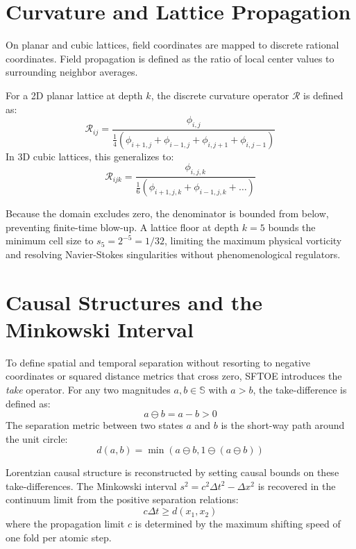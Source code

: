 \documentclass[11pt,a4paper]{article}
\begin{document}
\section{Curvature and Lattice Propagation}
On planar and cubic lattices, field coordinates are mapped to discrete rational coordinates. Field propagation is defined as the ratio of local center values to surrounding neighbor averages.

For a 2D planar lattice at depth $k$, the discrete curvature operator $\mathcal{R}$ is defined as:
\begin{equation}
\mathcal{R}_{ij} = \frac{\phi_{i,j}}{\frac{1}{4}(\phi_{i+1,j} + \phi_{i-1,j} + \phi_{i,j+1} + \phi_{i,j-1})}
\end{equation}
In 3D cubic lattices, this generalizes to:
\begin{equation}
\mathcal{R}_{ijk} = \frac{\phi_{i,j,k}}{\frac{1}{6}(\phi_{i+1,j,k} + \phi_{i-1,j,k} + \dots)}
\end{equation}

Because the domain excludes zero, the denominator is bounded from below, preventing finite-time blow-up. A lattice floor at depth $k=5$ bounds the minimum cell size to $s_5 = 2^{-5} = 1/32$, limiting the maximum physical vorticity and resolving Navier-Stokes singularities without phenomenological regulators.

\section{Causal Structures and the Minkowski Interval}
To define spatial and temporal separation without resorting to negative coordinates or squared distance metrics that cross zero, SFTOE introduces the \textit{take} operator. For any two magnitudes $a, b \in \mathbb{S}$ with $a > b$, the take-difference is defined as:
\begin{equation}
a \ominus b = a - b > 0
\end{equation}
The separation metric between two states $a$ and $b$ is the short-way path around the unit circle:
\begin{equation}
d(a, b) = \min(a \ominus b, 1 \ominus (a \ominus b))
\end{equation}

Lorentzian causal structure is reconstructed by setting causal bounds on these take-differences. The Minkowski interval $s^2 = c^2 \Delta t^2 - \Delta x^2$ is recovered in the continuum limit from the positive separation relations:
\begin{equation}
c \Delta t \ge d(x_1, x_2)
\end{equation}
where the propagation limit $c$ is determined by the maximum shifting speed of one fold per atomic step.
\end{document}
